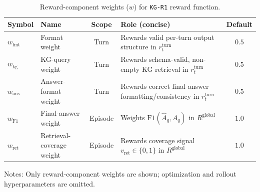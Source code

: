\begin{table}[H]
\centering
\caption{Reward-component weights (\emph{$w$}) for \texttt{KG\mbox{-}R1} reward function.}
\label{tab:kgr1_eweights}
\footnotesize
\begin{tabularx}{\textwidth}{@{}l l c X c@{}}
\toprule
\textbf{Symbol} & \textbf{Name} & \textbf{Scope} & \textbf{Role (concise)} & \textbf{Default} \\
\midrule
$w_{\mathrm{fmt}}$ & Format weight & Turn & Rewards valid per-turn output structure in $r_t^{\text{turn}}$ & $0.5$ \\
$w_{\mathrm{kg}}$  & KG-query weight & Turn & Rewards schema-valid, non-empty KG retrieval in $r_t^{\text{turn}}$ & $0.5$ \\
$w_{\mathrm{ans}}$ & Answer-format weight & Turn & Rewards correct final-answer formatting/consistency in $r_t^{\text{turn}}$ & $0.5$ \\
$w_{\mathrm{F1}}$  & Final-answer weight & Episode & Weights $\mathrm{F1}(\hat A_q, A_q)$ in $R^{\text{global}}$ & $1.0$ \\
$w_{\mathrm{ret}}$ & Retrieval-coverage weight & Episode & Rewards coverage signal $v_{\mathrm{ret}}\!\in\!\{0,1\}$ in $R^{\text{global}}$ & $1.0$ \\
\bottomrule
\end{tabularx}
\label{tab:reward_weights}
\vspace{2pt}
\raggedright\footnotesize
Notes: Only reward-component weights are shown; optimization and rollout hyperparameters are omitted.
\end{table}
